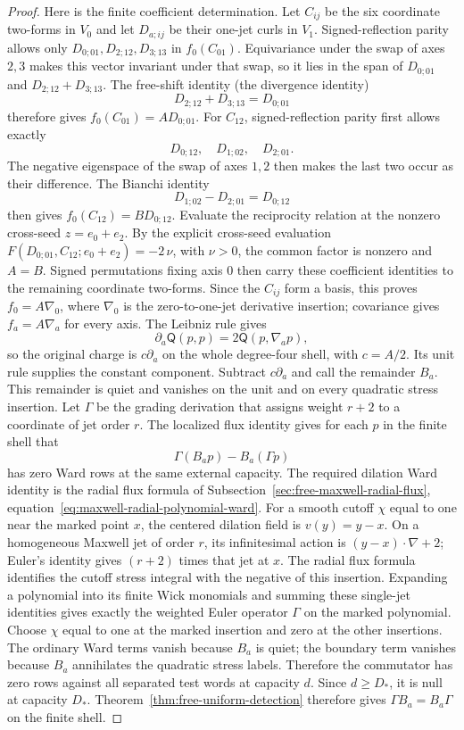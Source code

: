 \begin{proof}
Here is the finite coefficient determination.  Let $C_{ij}$ be the six
coordinate two-forms in $V_0$ and let $D_{a;ij}$ be their one-jet curls in
$V_1$.  Signed-reflection parity allows only
$D_{0;01},D_{2;12},D_{3;13}$ in $f_0(C_{01})$.  Equivariance under the
swap of axes $2,3$ makes this vector invariant under that swap, so it lies
in the span of $D_{0;01}$ and $D_{2;12}+D_{3;13}$.  The free-shift
identity (the divergence identity)
\[
 D_{2;12}+D_{3;13}=D_{0;01}
\]
therefore gives $f_0(C_{01})=A D_{0;01}$.  For $C_{12}$,
signed-reflection parity first allows exactly
\[
 D_{0;12},\quad D_{1;02},\quad D_{2;01}.
\]  The negative eigenspace of the swap of
axes $1,2$ then makes the last two occur as their difference.  The Bianchi identity
\[
 D_{1;02}-D_{2;01}=D_{0;12}
\]
then gives
$f_0(C_{12})=B D_{0;12}$.  Evaluate the reciprocity relation at the
nonzero cross-seed $z=e_0+e_2$.  By the explicit cross-seed evaluation
$F(D_{0;01},C_{12};e_0+e_2)=-2\,\nu$, with
$\nu>0$, the common factor is nonzero and $A=B$.  Signed permutations fixing axis $0$ then carry these coefficient
identities to the remaining coordinate two-forms.  Since the $C_{ij}$ form
a basis, this proves $f_0=A\nabla_0$, where $\nabla_0$ is the
zero-to-one-jet derivative insertion; covariance gives
$f_a=A\nabla_a$ for every axis.  The Leibniz rule gives
\[
 \partial_a\mathsf Q(p,p)=2\mathsf Q(p,\nabla_a p),
\]
so the original charge is $c\partial_a$ on the whole degree-four shell,
with $c=A/2$.  Its unit rule supplies the constant component.  Subtract
$c\partial_a$ and call the remainder $B_a$.  This remainder is quiet and
vanishes on the unit and on every quadratic
stress insertion.  Let $\Gamma$ be the grading derivation that assigns
weight $r+2$ to a coordinate of jet order $r$.  The localized flux identity
gives for each $p$ in the finite shell that
\[
 \Gamma(B_a p)-B_a(\Gamma p)
\]
has zero Ward rows at the same external capacity.  The required dilation Ward identity is the radial flux formula of
Subsection~\ref{sec:free-maxwell-radial-flux}, equation~\eqref{eq:maxwell-radial-polynomial-ward}.  For a smooth cutoff
$\chi$ equal to one near the marked point $x$, the centered dilation
field is $v(y)=y-x$.  On a homogeneous Maxwell jet of order $r$, its
infinitesimal action is $(y-x)\cdot\nabla+2$; Euler's identity gives
$(r+2)$ times that jet at $x$.  The radial flux formula identifies the
cutoff stress integral with the negative of this insertion.  Expanding a
polynomial into its finite Wick monomials and summing these single-jet
identities gives exactly the weighted Euler operator $\Gamma$ on the
marked polynomial.  Choose $\chi$ equal to one at the marked insertion
and zero at the other insertions.  The ordinary Ward terms vanish because
$B_a$ is quiet; the boundary term vanishes because $B_a$ annihilates the
quadratic stress labels.  Therefore the commutator has zero rows against
all separated test words at capacity $d$.  Since $d\geq D_*$, it is null
at capacity $D_*$.  Theorem~\ref{thm:free-uniform-detection}
therefore gives $\Gamma B_a=B_a\Gamma$ on the finite shell.


\end{proof}
